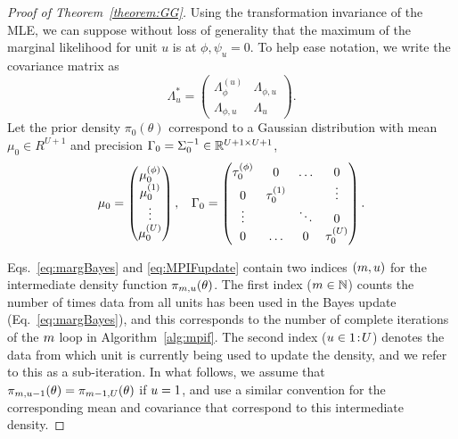 \begin{proof}[Proof of Theorem~\ref{theorem:GG}]
Using the transformation invariance of the MLE, we can suppose without loss of generality that the maximum of the marginal likelihood for unit $u$ is at $\phi, \psi_u = 0$.
To help ease notation, we write the covariance matrix as
$$
\Lambda^*_u = \begin{pmatrix}
    \Lambda^{(u)}_{\phi} & \Lambda_{\phi, u} \\
    \Lambda_{\phi, u} & \Lambda_{u}
\end{pmatrix}.
$$
Let the prior density $\pi_0(\theta)$ correspond to a Gaussian distribution with mean $\mu_0 \in R^{U+1}$ and precision $\Gamma_0 = \Sigma^{-1}_0 \in \mathbb{R}^{U+1\times U+1}$,
\begin{align*}
    \mu_0 = \begin{pmatrix}
        \mu_0^{(\phi)} \\ 
        \mu_0^{(1)} \\ 
        \vdots \\
        \mu_0^{(U)}
    \end{pmatrix}, \, \, \hspace{2mm} \Gamma_0 = \begin{pmatrix}
        \tau^{(\phi)}_0 & 0 & \ldots & 0 \\
        0 & \tau^{(1)}_0 & & \vdots \\ 
        \vdots & & \ddots & 0\\
        0 & \ldots & 0 & \tau^{(U)}_0
    \end{pmatrix}.
\end{align*}

Eqs.~\ref{eq:margBayes} and \ref{eq:MPIFupdate} contain two indices $(m, u)$ for the intermediate density function $\pi_{m, u}(\theta)$.
The first index ($m \in \mathbb{N}$) counts the number of times data from all units has been used in the Bayes update (Eq.~\ref{eq:margBayes}), and this corresponds to the number of complete iterations of the $m$ loop in Algorithm~\ref{alg:mpif}. 
The second index ($u \in {1}\!:\!{U}$) denotes the data from which unit is currently being used to update the density, and we refer to this as a sub-iteration. 
In what follows, we assume that $\pi_{m, u - 1}(\theta) = \pi_{m - 1, U}(\theta)$ if $u = 1$, and use a similar convention for the corresponding mean and covariance that correspond to this intermediate density. 


\end{proof}
